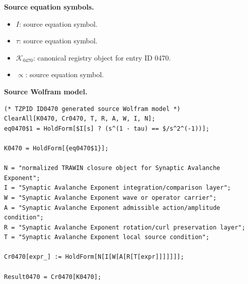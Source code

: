 \begin{minipage}[t]{0.49\linewidth}
\begingroup
\small
\raggedright
\textbf{Source equation symbols.}\par
\begin{itemize}[leftmargin=1.35em,itemsep=1pt,topsep=1pt,parsep=0pt]
    \item $I$: source equation symbol.
    \item $\tau$: source equation symbol.
    \item $\mathcal{K}_{0470}$: canonical registry object for entry ID 0470.
    \item $\propto$: source equation symbol.
\end{itemize}
\endgroup
\end{minipage}\hfill
\begin{minipage}[t]{0.47\linewidth}
\begingroup
\scriptsize
\raggedright
\textbf{Source Wolfram model.}\par
\begin{Verbatim}[fontsize=\tiny,breaklines=true,breakanywhere=true]
(* TZPID ID0470 generated source Wolfram model *)
ClearAll[K0470, Cr0470, T, R, A, W, I, N];
eq0470$1 = HoldForm[$I[s] ? (s^(1 - tau) == $/s^2^(-1))];

K0470 = HoldForm[{eq0470$1}];

N = "normalized TRAWIN closure object for Synaptic Avalanche Exponent";
I = "Synaptic Avalanche Exponent integration/comparison layer";
W = "Synaptic Avalanche Exponent wave or operator carrier";
A = "Synaptic Avalanche Exponent admissible action/amplitude condition";
R = "Synaptic Avalanche Exponent rotation/curl preservation layer";
T = "Synaptic Avalanche Exponent local source condition";

Cr0470[expr_] := HoldForm[N[I[W[A[R[T[expr]]]]]]];

Result0470 = Cr0470[K0470];
\end{Verbatim}
\endgroup
\end{minipage}

